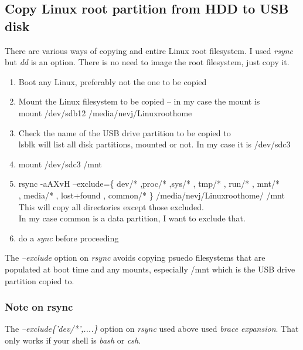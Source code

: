 \documentclass{article}  %
\begin{document}
\subsection{Copy Linux root partition from HDD to USB disk}
There are various ways of copying and entire Linux root filesystem. I used {\em rsync} but {\em dd} is an option. There is no need to image the root filesystem, just copy it.

\begin{enumerate}
\item Boot any Linux, preferably not  the one to be copied
\item Mount the Linux filesystem to be copied -- in my case the mount is \\
mount /dev/sdb12 /media/nevj/Linuxroothome
\item Check the name of the USB drive partition to be copied to  \\
 lsblk will list all disk partitions, mounted or not.  In my case it is /dev/sdc3
\item mount /dev/sdc3 /mnt
\item rsync -aAXvH --exclude=\{ \textquotesingle dev/* \textquotesingle ,\textquotesingle proc/* \textquotesingle ,\textquotesingle sys/* \textquotesingle , \textquotesingle tmp/* \textquotesingle , \textquotesingle run/* \textquotesingle , \textquotesingle mnt/* \textquotesingle \\
      , \textquotesingle media/* \textquotesingle , \textquotesingle lost+found \textquotesingle , \textquotesingle common/* \textquotesingle \} /media/nevj/Linuxroothome/ /mnt  \\
This will copy all directories except those excluded. \\
In my case common is a data partition, I want to exclude that.
\item do a {\em sync} before proceeding
\end{enumerate}
The {\em --exclude} option on {\em rsync} avoids copying psuedo filesystems that are populated at boot time and any mounts, especially /mnt which is the USB drive partition copied to.

\subsubsection{Note on rsync}
The {\em --exclude\{'dev/*',....\}} option on {\em rsync} used above used {\em brace expansion}. That only works if your shell is {\em bash} or {\em csh}. 
\end{document}
